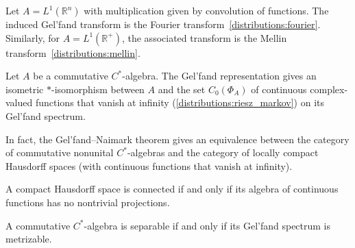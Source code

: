 
    \begin{example}
        Let $A=L^1(\mathbb{R}^n)$ with multiplication given by convolution of functions. The induced Gel'fand transform is the Fourier transform~\eqref{distributions:fourier}. Similarly, for $A=L^1(\mathbb{R}^+)$, the associated transform is the Mellin transform~\ref{distributions:mellin}.
    \end{example}

    \begin{theorem}
        Let $A$ be a commutative $C^*$-algebra. The Gel'fand representation gives an isometric $\ast$-isomorphism between $A$ and the set $C_0(\Phi_A)$ of continuous complex-valued functions that vanish at infinity (\cref{distributions:riesz_markov}) on its Gel'fand spectrum.
    \end{theorem}
    \begin{remark}
        In fact, the Gel'fand--Naimark theorem gives an equivalence between the category of commutative nonunital $C^*$-algebras and the category of locally compact Hausdorff spaces (with continuous functions that vanish at infinity).
    \end{remark}

    \begin{property}[Connectedness]
        A compact Hausdorff space is connected if and only if its algebra of continuous functions has no nontrivial projections.
    \end{property}
    \begin{property}[Metrizability]
        A commutative $C^*$-algebra is separable if and only if its Gel'fand spectrum is metrizable.
    \end{property}

